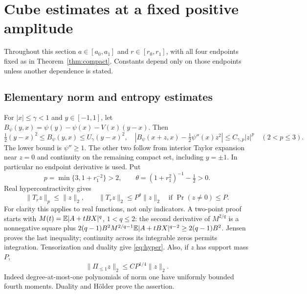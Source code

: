 \section{Cube estimates at a fixed positive amplitude}\label{sec:compact}
Throughout this section $a\in[a_0,a_1]$ and $r\in[r_0,r_1]$, with
all four endpoints fixed as in Theorem~\ref{thm:compact}.
Constants depend only on those endpoints unless another dependence is stated.

\subsection{Elementary norm and entropy estimates}
For $|x|\le\gamma<1$ and $y\in[-1,1]$, let
$B_\psi(y,x)=\psi(y)-\psi(x)-V(x)(y-x)$. Then
\begin{equation}\label{eq:bregman}
 \tfrac12(y-x)^2\le B_\psi(y,x)\le U_\gamma(y-x)^2,
 \quad |B_\psi(x+z,x)-\tfrac12\psi''(x)z^2|
 \le C_{\gamma,p}|z|^p\quad(2<p\le3).
\end{equation}
The lower bound is $\psi''\ge1$. The other two follow from interior
Taylor expansion near $z=0$ and continuity on the remaining compact
set, including $y=\pm1$. In particular no endpoint derivative is used.
Put
\[
 p=\min\{3,1+r_1^{-2}\}>2,\qquad
 \theta=(1+r_1^2)^{-1}-\tfrac12>0.
\]
Real hypercontractivity \cite{Bonami,Beckner} gives
\begin{equation}\label{eq:hyper}
 \|T_rz\|_p\le\|z\|_2,\qquad
 \|T_rz\|_2\le P^\theta\|z\|_2
 \quad\text{if }\Pr(z\ne0)\le P.
\end{equation}
For clarity this applies to real functions, not only indicators.
A two-point proof starts with $M(t)=\mathbb E|A+tBX|^q$, $1<q\le2$:
the second derivative of $M^{2/q}$ is a nonnegative square plus
$2(q-1)B^2 M^{2/q-1}\mathbb E|A+tBX|^{q-2}\ge2(q-1)B^2$.
Jensen proves the last inequality; continuity across its integrable
zeros permits integration. Tensorization and duality give
\eqref{eq:hyper}.
Also, if $z$ has support mass $P$,
\begin{equation}\label{eq:lowproj}
 \|\Pi_{\le1}z\|_2\le C P^{1/4}\|z\|_2.
\end{equation}
Indeed degree-at-most-one polynomials of norm one have uniformly
bounded fourth moments. Duality and H\"older prove the assertion.

